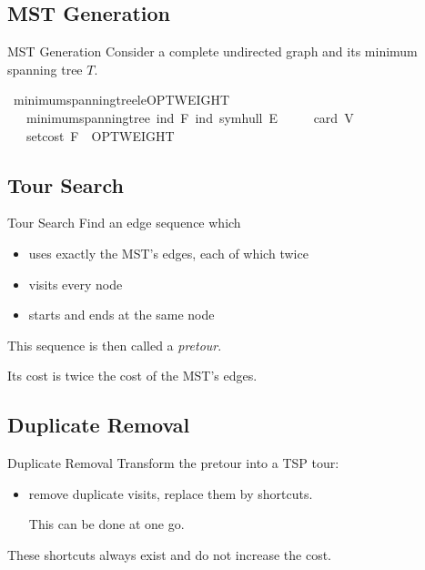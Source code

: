 \documentclass[%
	sans,
	12pt,
]{beamer}
\newcommand{\high}[1]{{\usebeamercolor[fg]{structure} #1}}
\def\isacartoucheopen{}%
\def\isacartoucheclose{}%
\begin{document}
\subsection{MST Generation}
\begin{frame}{MST Generation}\pause
Consider a complete undirected graph and its minimum spanning tree $T$.\pause%


\begin{isabelle}
\isamarkupfalse%
\ minimum{\isacharunderscore}spanning{\isacharunderscore}tree{\isacharunderscore}le{\isacharunderscore}OPTWEIGHT{\isacharcolon}\isanewline
\ \ \ {\isacartoucheopen}minimum{\isacharunderscore}spanning{\isacharunderscore}tree\ {\isacharparenleft}ind\ F{\isacharparenright}\ {\isacharparenleft}ind\ {\isacharparenleft}symhull\ E{\isacharparenright}{\isacharparenright}{\isacartoucheclose}\isanewline
\ \ \ {\isacartoucheopen}{}\ {\isasymle}\ card\ V{\isacartoucheclose}\isanewline
\ \ \ {\isacartoucheopen}set{\isacharunderscore}cost\ F\ {\isasymle}\ OPTWEIGHT{\isacartoucheclose}
\end{isabelle}
\end{frame}

\subsection{Tour Search}
\begin{frame}{Tour Search}
Find an edge sequence which\pause
\begin{itemize}
	\item uses exactly the MST's edges, each of which twice\pause
	\item visits every node\pause
	\item starts and ends at the same node\pause
\end{itemize}
This sequence is then called a \textit{pretour}.\pause

Its cost is twice the cost of the MST's edges.
\end{frame}

\subsection{Duplicate Removal}
\begin{frame}{Duplicate Removal}
Transform the pretour into a TSP tour:
\begin{itemize}
	\item remove duplicate visits, replace them by shortcuts.\pause
	
	\high{This can be done at one go.}
\end{itemize}
These shortcuts always exist and do not increase the cost. %
\end{frame}
\end{document}
